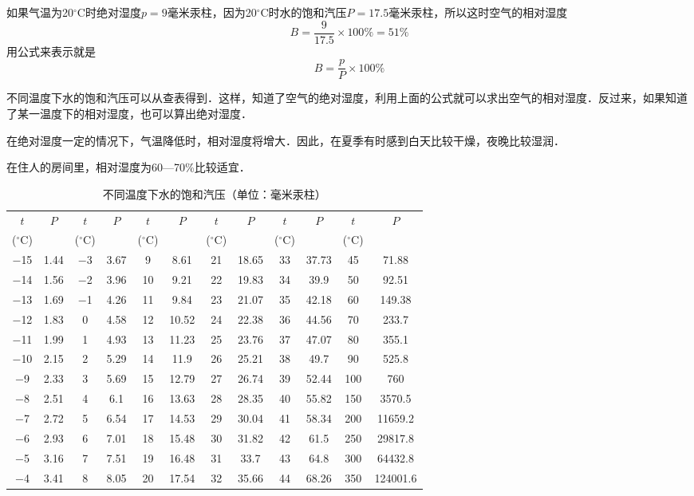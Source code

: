 如果气温为20$^\circ$C时绝对湿度$p=9$毫米汞柱，因为20$^\circ$C时水的饱和汽压$P=17.5$毫米汞柱，所以这时空气的相对湿度
\[B=\frac{9}{17.5}\times 100\%=51\% \]
用公式来表示就是
\[B=\frac{p}{P}\times 100\% \]

不同温度下水的饱和汽压可以从查表得到．这样，知道了空气的绝对湿度，利用上面的公式就可以求出空气的相对湿度．反过来，如果知道了某一温度下的相对湿度，也可以算出绝对湿度．

在绝对湿度一定的情况下，气温降低时，相对湿度将增大．因此，在夏季有时感到白天比较干燥，夜晚比较湿润．

在住人的房间里，相对湿度为60—70\%比较适宜．

\begin{table}
    \centering
    \caption{不同温度下水的饱和汽压（单位：毫米汞柱）}
    \begin{tabular}{cccccccccccc}
\hline
    $t$ & $P$ &$t$ & $P$ &$t$ & $P$ &$t$ & $P$ &$t$ & $P$ &$t$ & $P$ \\
($^\circ$C)&&($^\circ$C)&&($^\circ$C)&&($^\circ$C)&&($^\circ$C)&&($^\circ$C)\\
\hline
$-$15  &  1.44  &  $-$3  &  3.67  &  9  &  8.61  &  21  &  18.65  &  33  &  37.73  &  45  &  71.88\\
$-$14  &  1.56  &  $-$2  &  3.96  &  10  &  9.21  &  22  &  19.83  &  34  &  39.9  &  50  &  92.51\\
$-$13  &  1.69  &  $-$1  &  4.26  &  11  &  9.84  &  23  &  21.07  &  35  &  42.18  &  60  &  149.38\\
$-$12  &  1.83  &  0  &  4.58  &  12  &  10.52  &  24  &  22.38  &  36  &  44.56  &  70  &  233.7\\
$-$11  &  1.99  &  1  &  4.93  &  13  &  11.23  &  25  &  23.76  &  37  &  47.07  &  80  &  355.1\\
$-$10  &  2.15  &  2  &  5.29  &  14  &  11.9  &  26  &  25.21  &  38  &  49.7  &  90  &  525.8\\
$-$9  &  2.33  &  3  &  5.69  &  15  &  12.79  &  27  &  26.74  &  39  &  52.44  &  100  &  760\\
$-$8  &  2.51  &  4  &  6.1  &  16  &  13.63  &  28  &  28.35  &  40  &  55.82  &  150  &  3570.5\\
$-$7  &  2.72  &  5  &  6.54  &  17  &  14.53  &  29  &  30.04  &  41  &  58.34  &  200  &  11659.2\\
$-$6  &  2.93  &  6  &  7.01  &  18  &  15.48  &  30  &  31.82  &  42  &  61.5  &  250  &  29817.8\\
$-$5  &  3.16  &  7  &  7.51  &  19  &  16.48  &  31  &  33.7  &  43  &  64.8  &  300  &  64432.8\\
$-$4  &  3.41  &  8  &  8.05  &  20  &  17.54  &  32  &  35.66  &  44  &  68.26  &  350  &  124001.6\\
\hline
    \end{tabular}
\end{table}

